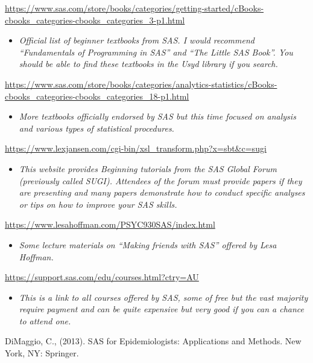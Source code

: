 \documentclass[
]{book}
\providecommand{\tightlist}{%
  \setlength{\itemsep}{0pt}\setlength{\parskip}{0pt}}
\begin{document}
\url{https://www.sas.com/store/books/categories/getting-started/cBooks-cbooks_categories-cbooks_categories_3-p1.html}

\begin{itemize}
\tightlist
\item
  \emph{Official list of beginner textbooks from SAS. I would recommend ``Fundamentals of Programming in SAS'' and ``The Little SAS Book''. You should be able to find these textbooks in the Usyd library if you search.}
\end{itemize}

\url{https://www.sas.com/store/books/categories/analytics-statistics/cBooks-cbooks_categories-cbooks_categories_18-p1.html}

\begin{itemize}
\tightlist
\item
  \emph{More textbooks officially endorsed by SAS but this time focused on analysis and various types of statistical procedures.}
\end{itemize}

\url{https://www.lexjansen.com/cgi-bin/xsl_transform.php?x=sbt&c=sugi}

\begin{itemize}
\tightlist
\item
  \emph{This website provides Beginning tutorials from the SAS Global Forum (previously called SUGI). Attendees of the forum must provide papers if they are presenting and many papers demonstrate how to conduct specific analyses or tips on how to improve your SAS skills.}
\end{itemize}

\url{https://www.lesahoffman.com/PSYC930SAS/index.html}

\begin{itemize}
\tightlist
\item
  \emph{Some lecture materials on ``Making friends with SAS'' offered by Lesa Hoffman.}
\end{itemize}

\url{https://support.sas.com/edu/courses.html?ctry=AU}

\begin{itemize}
\tightlist
\item
  \emph{This is a link to all courses offered by SAS, some of free but the vast majority require payment and can be quite expensive but very good if you can a chance to attend one.}
\end{itemize}

DiMaggio, C., (2013). SAS for Epidemiologists: Applications and Methods. New York, NY: Springer.
\end{document}
